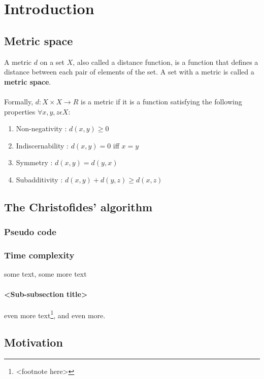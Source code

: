 \chapter{Introduction}
\section{Metric space}
A metric $d$ on a set $X$, also called a distance function, is a function
that defines a distance between each pair of elements of the set. A
set with a metric is called a \textbf{metric space}.\\\\
Formally, $d : X \times X \rightarrow R$ is a metric if it is a function satisfying the following properties $\forall x, y, z \epsilon X$:
\begin{enumerate}
\item{Non-negativity : $d(x, y) \geq 0$}
\item{Indiscernability : $d(x, y) = 0$ iff $x = y$}
\item{Symmetry : $d(x, y) = d(y, x)$}
\item{Subadditivity : $d(x, y) + d(y, z) \geq d(x, z)$}
\end{enumerate}
\section{The Christofides' algorithm}
\subsection{Pseudo code}
\subsection{Time complexity}
some text\cite{citation-1-name-here}, some more text

\subsubsection{<Sub-subsection title>}
even more text\footnote{<footnote here>}, and even more.

\section{Motivation}
